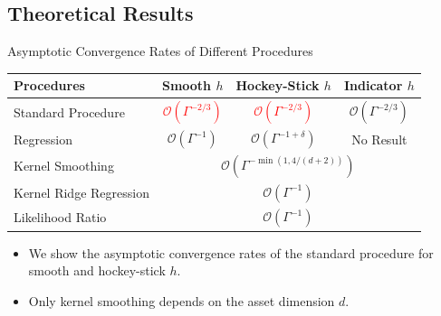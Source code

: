 \documentclass[9pt,handout]{beamer}
\begin{document}
\subsection{Theoretical Results}

\begin{frame}{Asymptotic Convergence Rates of Different Procedures}

    \begin{table}
		\centering
		\begin{tabular}{l|c|c|c}
			\toprule
			\textbf{Procedures} & \textbf{Smooth $h$} & \textbf{Hockey-Stick $h$} & \textbf{Indicator $h$}  \\
			\midrule
			Standard Procedure	& \textcolor{red}{$\mathcal{O}(\Gamma^{-2/3})$} & \textcolor{red}{$\mathcal{O}(\Gamma^{-2/3})$} & $\mathcal{O}(\Gamma^{-2/3})$ \\
			\midrule
			Regression  & $\mathcal{O}(\Gamma^{-1})$ & $\mathcal{O}(\Gamma^{-1+\delta})$ & No Result \\
			\midrule
			Kernel Smoothing 	& \multicolumn{3}{c}{$\mathcal{O}(\Gamma^{-\min(1, 4/(d+2))})$}  \\
			\midrule
			Kernel Ridge Regression  		& \multicolumn{3}{c}{$\mathcal{O}(\Gamma^{-1})$} \\
			\midrule
			Likelihood Ratio  			& \multicolumn{3}{c}{$\mathcal{O}(\Gamma^{-1})$} \\
			\bottomrule
		\end{tabular}
	\end{table}
    \vspace{10pt}
    \begin{itemize}
        \item We show the asymptotic convergence rates of the standard procedure for smooth and hockey-stick $h$.
        \item Only kernel smoothing depends on the asset dimension $d$.
    \end{itemize}
    
\end{frame}
\end{document}
